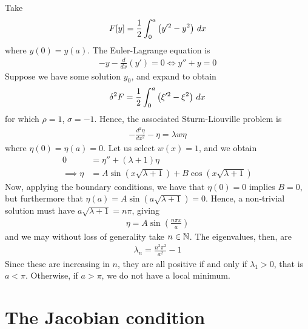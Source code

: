\documentclass{../../template/note}
\begin{document}
    \begin{example*}
        Take
        \begin{align*}
            F[y] = \frac 1 2 \int_0^a \left(y'^2-y^2\right) \,d{x}
        \end{align*}
        where $y(0) = y(a)$. The Euler-Lagrange equation is
        \begin{align*}
            -y-\frac{d}{dx}(y') = 0 \iff y'' + y = 0
        \end{align*}
        Suppose we have some solution $y_0$, and expand to obtain
        \begin{align*}
            \delta^2 F = \frac 1 2 \int_0^a \left(\xi'^2 - \xi^2\right) \,d{x}
        \end{align*}
        for which $\rho = 1$, $\sigma = -1$. Hence, the associated Sturm-Liouville problem is
        \begin{align*}
            -\frac{d^2\eta}{dx^2}-\eta = \lambda w \eta
        \end{align*}
        where $\eta(0) = \eta(a) = 0$. Let us select $w(x) = 1$, and we obtain
        \begin{align*}
            0 &= \eta'' + (\lambda+1)\eta \\
            \implies \eta &= A \sin\left(x\sqrt{\lambda+1}\right) + B\cos\left(x\sqrt{\lambda+1}\right)
        \end{align*}
        Now, applying the boundary conditions, we have that $\eta(0) = 0$ implies $B=0$, but furthermore that $\eta(a) = A \sin\left(a\sqrt{\lambda+1}\right) = 0$. Hence, a non-trivial solution must have $a\sqrt{\lambda+1} = n\pi$, giving
        \begin{align*}
            \eta = A \sin \left(\frac{n\pi x}{a}\right)
        \end{align*}
        and we may without loss of generality take $n \in \mathbb N$. The eigenvalues, then, are
        \begin{align*}
            \lambda_n = \frac{n^2\pi^2}{a^2}-1
        \end{align*}
        Since these are increasing in $n$, they are all positive if and only if $\lambda_1 > 0$, that is $a < \pi$. Otherwise, if $a > \pi$, we do not have a local minimum.
    \end{example*}
    
    \section{The Jacobian condition}
\end{document}
